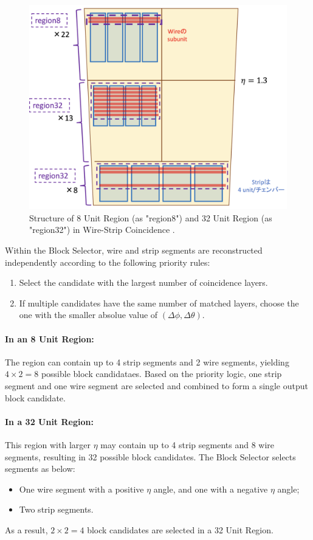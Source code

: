 \begin{figure}[htbp]
  \centering
  \includegraphics[width=1.0\textwidth]{figs/chapter5/wsc_region.png}
  \caption{Structure of 8 Unit Region (as "region8") and 32 Unit Region (as "region32") in Wire-Strip Coincidence \cite{yamashita}.}
  \label{fig:wsc_region}
\end{figure}

Within the Block Selector, wire and strip segments are reconstructed independently according to the following priority rules:
\begin{enumerate}
  \item Select the candidate with the largest number of coincidence layers.
  \item If multiple candidates have the same number of matched layers, choose the one with the smaller absolue value of \((\Delta\phi, \Delta\theta)\).
\end{enumerate}

\paragraph{In an 8 Unit Region:}  
The region can contain up to 4 strip segments and 2 wire segments, yielding $4 \times 2 = 8$ possible block candidataes. Based on the priority logic, one strip segment and one wire segment are selected and combined to form a single output block candidate.

\paragraph{In a 32 Unit Region:}  
This region with larger $\eta$ may contain up to 4 strip segments and 8 wire segments, resulting in 32 possible block candidates. The Block Selector selects segments as below:
\begin{itemize}
  \item One wire segment with a positive $\eta$ angle, and one with a negative $\eta$ angle;
  \item Two strip segments.
\end{itemize}
As a result, $2 \times 2 = 4$ block candidates are selected in a 32 Unit Region.


